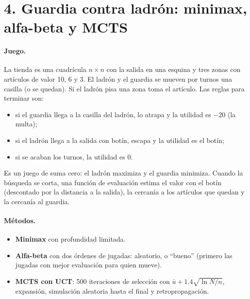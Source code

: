\section*{4. Guardia contra ladrón: minimax, alfa-beta y MCTS}
\label{p2:sec:p4}

\paragraph{Juego.} La tienda es una cuadrícula $n\times n$ con la salida en una esquina y tres zonas con artículos de valor 10, 6 y 3. El ladrón y el guardia se mueven por turnos una casilla (o se quedan). Si el ladrón pisa una zona toma el artículo. Las reglas para terminar son:
\begin{itemize}[itemsep=1pt]
  \item si el guardia llega a la casilla del ladrón, lo atrapa y la utilidad es $-20$ (la multa);
  \item si el ladrón llega a la salida con botín, escapa y la utilidad es el botín;
  \item si se acaban los turnos, la utilidad es 0.
\end{itemize}
Es un juego de suma cero: el ladrón maximiza y el guardia minimiza. Cuando la búsqueda se corta, una función de evaluación estima el valor con el botín (descontado por la distancia a la salida), la cercanía a los artículos que quedan y la cercanía al guardia.

\paragraph{Métodos.}
\begin{itemize}[itemsep=1pt]
  \item \textbf{Minimax} con profundidad limitada.
  \item \textbf{Alfa-beta} con dos órdenes de jugadas: aleatorio, o ``bueno'' (primero las jugadas con mejor evaluación para quien mueve).
  \item \textbf{MCTS con UCT}: 500 iteraciones de selección con $\bar u+1.4\sqrt{\ln N/n}$, expansión, simulación aleatoria hasta el final y retropropagación.
\end{itemize}

